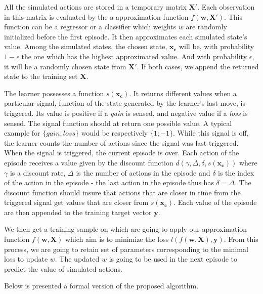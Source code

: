 \documentclass[scrartcl, 10.5 pt, conference]{ieeeconf}
\newcommand{\B}[1]{\mathbf{#1}}
\begin{document}
All the simulated actions are stored in a temporary matrix $\B{X'}$. Each observation in this matrix is evaluated by the a approximation function $f(\B{w},\B{X'})$. This function can be a regressor or a classifier which weights $w$ are randomly initialized before the first episode. It then approximates each simulated state's value. Among the simulated states, the chosen state, $\B{x_c}$ will be, with probability $1-\epsilon$ the one which has the highest approximated value. And with probability $\epsilon$, it will be a randomly chosen state from $\B{X'}$. If both cases, we append the returned state to the training set $\B{X}$.

The learner possesses a function $s(\B{x_c})$. It returns different values when a particular signal, function of the state generated by the learner's last move, is triggered. Its value is positive if a \textit{gain} is sensed, and negative value if a \textit{loss} is sensed. The signal function should at return one possible value. A typical example for $\{gain;loss\}$ would be respectively $\{1;-1\}$. While this signal is off, the learner counts the number of actions since the signal was last triggered. When the signal is triggered, the current episode is over. Each action of the episode receives a value given by the discount function $d(\gamma, \Delta, \delta, s(\B{x_c}))$ where $\gamma$ is a discount rate, $\Delta$ is the number of actions in the episode and $\delta$ is the index of the action in the episode - the last action in the episode thus has $\delta=\Delta$. The discount function should insure that actions that are closer in time from the triggered signal get values that are closer from $s(\B{x_c})$. Each value of the episode are then appended to the training target vector $\B{y}$. 

We then get a training sample on which are going to apply our approximation function $f(\B{w}, \B{X})$ which aim is to minimize the loss $l(f(\B{w}, \B{X}),\B{y})$. From this process, we are going to retain set of parameters corresponding to the minimal loss to update $w$. The updated $w$ is going to be used in the next episode to predict the value of simulated actions.

Below is presented a formal version of the proposed algorithm.
\end{document}
